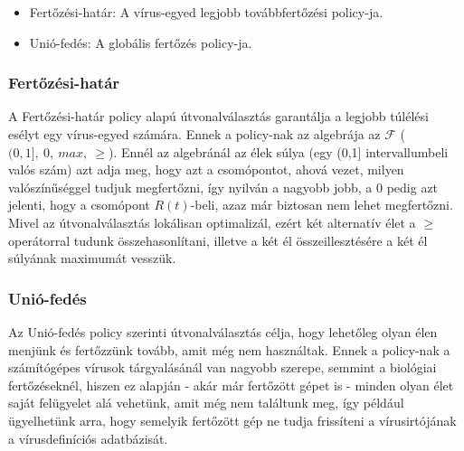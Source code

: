     \begin{itemize}
      \item Fertőzési-határ: A vírus-egyed legjobb továbbfertőzési policy-ja.
      \item Unió-fedés: A globális fertőzés policy-ja.
    \end{itemize}

      \subsubsection{Fertőzési-határ}

      A Fertőzési-határ policy alapú útvonalválasztás garantálja a legjobb túlélési esélyt egy vírus-egyed számára. Ennek a policy-nak az algebrája az $\mathcal{F}$ ($(0,1],~0,~max,~\geq$). Ennél az algebránál az élek súlya (egy (0,1] intervallumbeli valós szám) azt adja meg, hogy azt a csomópontot, ahová vezet, milyen valószínűséggel tudjuk megfertőzni, így nyilván a nagyobb jobb, a 0 pedig azt jelenti, hogy a csomópont $R(t)$-beli, azaz már biztosan nem lehet megfertőzni. Mivel az útvonalválasztás lokálisan optimalizál, ezért két alternatív élet a $\geq$ operátorral tudunk összehasonlítani, illetve a két él összeillesztésére a két él súlyának maximumát vesszük.

      \subsubsection{Unió-fedés}

      Az Unió-fedés policy szerinti útvonalválasztás célja, hogy lehetőleg olyan élen menjünk és fertőzzünk tovább, amit még nem használtak. Ennek a policy-nak a számítógépes vírusok tárgyalásánál van nagyobb szerepe, semmint a biológiai fertőzéseknél, hiszen ez alapján - akár már fertőzött gépet is - minden olyan élet saját felügyelet alá vehetünk, amit még nem találtunk meg, így például ügyelhetünk arra, hogy semelyik fertőzött gép ne tudja frissíteni a vírusirtójának a vírusdefiníciós adatbázisát.

